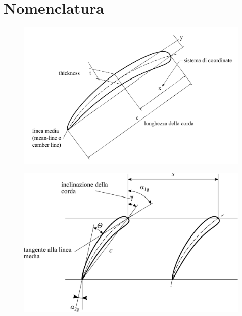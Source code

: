 \section{Nomenclatura}
\begin{figure}[h!]
\centering
\begin{minipage}{.5\textwidth}
  \centering
  \includegraphics[width=.98\linewidth]{fig/profiloDef.pdf}
  \label{}
\end{minipage}%
\begin{minipage}{.5\textwidth}
  \centering
  \includegraphics[width=.98\linewidth]{fig/schiera_2.pdf}
  \label{}
\end{minipage}
\end{figure}

